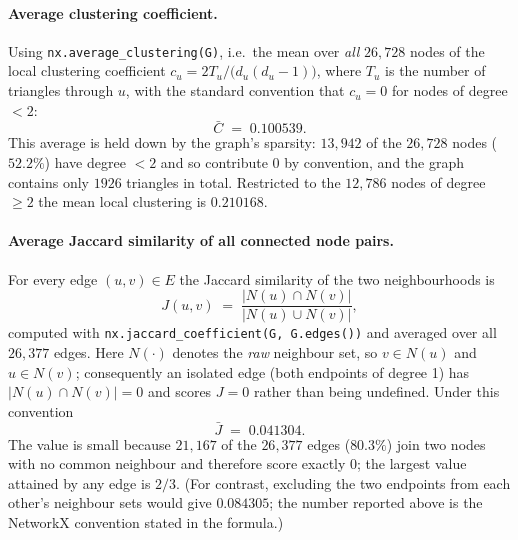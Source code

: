 \paragraph{Average clustering coefficient.}
Using \texttt{nx.average\_clustering(G)}, i.e.\ the mean over \emph{all} $26{,}728$
nodes of the local clustering coefficient
$c_u = 2T_u / \bigl(d_u(d_u-1)\bigr)$, where $T_u$ is the number of triangles
through $u$, with the standard convention that $c_u=0$ for nodes of degree $<2$:
\[
  \bar{C} \;=\; 0.100539 .
\]
This average is held down by the graph's sparsity: $13{,}942$ of the $26{,}728$
nodes ($52.2\%$) have degree $<2$ and so contribute $0$ by convention, and the
graph contains only $1926$ triangles in total. Restricted to the $12{,}786$ nodes
of degree $\ge 2$ the mean local clustering is $0.210168$.

\paragraph{Average Jaccard similarity of all connected node pairs.}
For every edge $(u,v)\in E$ the Jaccard similarity of the two neighbourhoods is
\[
  J(u,v) \;=\; \frac{\lvert N(u)\cap N(v)\rvert}{\lvert N(u)\cup N(v)\rvert},
\]
computed with \texttt{nx.jaccard\_coefficient(G, G.edges())} and averaged over all
$26{,}377$ edges. Here $N(\cdot)$ denotes the \emph{raw} neighbour set, so
$v\in N(u)$ and $u\in N(v)$; consequently an isolated edge (both endpoints of
degree 1) has $\lvert N(u)\cap N(v)\rvert=0$ and scores $J=0$ rather than being
undefined. Under this convention
\[
  \bar{J} \;=\; 0.041304 .
\]
The value is small because $21{,}167$ of the $26{,}377$ edges ($80.3\%$) join two
nodes with no common neighbour and therefore score exactly $0$; the largest value
attained by any edge is $2/3$. (For contrast, excluding the two endpoints from each
other's neighbour sets would give $0.084305$; the number reported above is the
NetworkX convention stated in the formula.)
